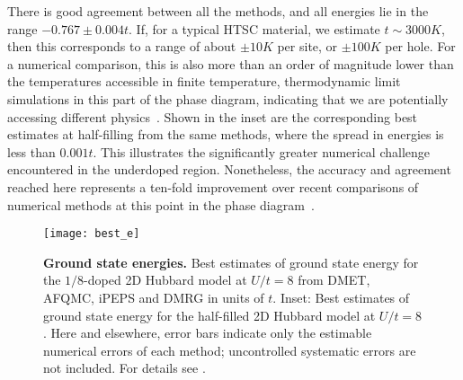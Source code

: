 \documentclass[12pt]{article}
\newcommand{\red}{}
\newcommand{\blue}{\textcolor{blue}}
\begin{document}
There is good agreement between all the methods, and all energies lie in the range 
$-0.767 \pm 0.004t$. If, for a typical HTSC material, we estimate $t \sim 3000K$, then this corresponds to a range
of about $\pm 10K$ per site, or $\pm 100K$ per hole. For a numerical comparison, this is also more than an order of magnitude lower than the   temperatures accessible in finite temperature, thermodynamic limit simulations in this part of the phase diagram, indicating
  that we are potentially accessing different physics~\cite{LeBlanc2015,wu2016controlling}.
Shown in the inset are the corresponding best estimates at half-filling
from the same methods, where the spread in energies is less than $0.001t$. This illustrates the significantly greater numerical
challenge encountered in the underdoped region. 
Nonetheless, the accuracy and agreement reached here represents a ten-fold improvement over 
recent comparisons of numerical methods at this point in the phase diagram~\cite{LeBlanc2015}.


\begin{figure}[htpb]
  \centering
  \texttt{[image: best\_e]}
  \caption{{\bf Ground state energies.} Best estimates of ground state energy for the $1/8$-doped 2D Hubbard model at $U/t=8$ from DMET, AFQMC, iPEPS and DMRG in units of $t$. 
    Inset: Best estimates of ground state energy
  for the half-filled 2D Hubbard model at $U/t=8$.
\red{Here and elsewhere, error bars indicate only the estimable numerical errors of each method; uncontrolled systematic errors are not included.} For details see \cite{supplementary}.
}
  \label{fig:energy_fig}
\end{figure}
\end{document}
